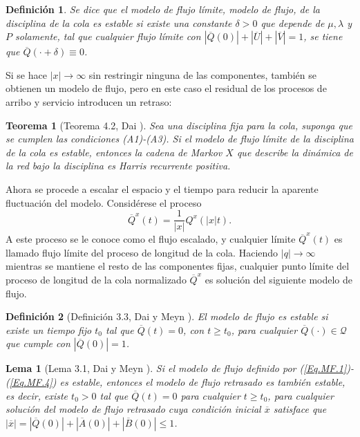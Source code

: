 \documentclass{article}
\newtheorem{Def}{Definición}
\newtheorem{Teo}{Teorema}
\newtheorem{Lemma}{Lema}
\begin{document}
\begin{Def}
Se dice que el modelo de flujo l\'imite, modelo de flujo, de la disciplina de la cola es estable si existe una constante $\delta>0$ que depende de $\mu,\lambda$ y $P$ solamente, tal que cualquier flujo l\'imite con $|\overline{Q}\left(0\right)|+|\overline{U}|+|\overline{V}|=1$, se tiene que $\overline{Q}\left(\cdot+\delta\right)\equiv0$.
\end{Def}

Si se hace $|x|\rightarrow\infty$ sin restringir ninguna de las componentes, tambi\'en se obtienen un modelo de flujo, pero en este caso el residual de los procesos de arribo y servicio introducen un retraso:
\begin{Teo}[Teorema 4.2, Dai \cite{Dai}]\label{Tma.4.2.Dai}
Sea una disciplina fija para la cola, suponga que se cumplen las condiciones (A1)-(A3). Si el modelo de flujo l\'imite de la disciplina de la cola es estable, entonces la cadena de Markov $X$ que describe la din\'amica de la red bajo la disciplina es Harris recurrente positiva.
\end{Teo}

Ahora se procede a escalar el espacio y el tiempo para reducir la aparente fluctuaci\'on del modelo. Consid\'erese el proceso
\begin{equation}\label{Eq.3.7}
\overline{Q}^{x}\left(t\right)=\frac{1}{|x|}Q^{x}\left(|x|t\right).
\end{equation}
A este proceso se le conoce como el flujo escalado, y cualquier l\'imite $\overline{Q}^{x}\left(t\right)$ es llamado flujo l\'imite del proceso de longitud de la cola. Haciendo $|q|\rightarrow\infty$ mientras se mantiene el resto de las componentes fijas, cualquier punto l\'imite del proceso de longitud de la cola normalizado $\overline{Q}^{x}$ es soluci\'on del siguiente modelo de flujo.


\begin{Def}[Definici\'on 3.3, Dai y Meyn \cite{DaiSean}]
El modelo de flujo es estable si existe un tiempo fijo $t_{0}$ tal que $\overline{Q}\left(t\right)=0$, con $t\geq t_{0}$, para cualquier $\overline{Q}\left(\cdot\right)\in\mathcal{Q}$ que cumple con $|\overline{Q}\left(0\right)|=1$.
\end{Def}

\begin{Lemma}[Lema 3.1, Dai y Meyn \cite{DaiSean}]
Si el modelo de flujo definido por (\ref{Eq.MF.1})-(\ref{Eq.MF.4}) es estable, entonces el modelo de flujo retrasado es tambi\'en estable, es decir, existe $t_{0}>0$ tal que $\overline{Q}\left(t\right)=0$ para cualquier $t\geq t_{0}$, para cualquier soluci\'on del modelo de flujo retrasado cuya condici\'on inicial $\overline{x}$ satisface que $|\overline{x}|=|\overline{Q}\left(0\right)|+|\overline{A}\left(0\right)|+|\overline{B}\left(0\right)|\leq1$.
\end{Lemma}
\end{document}
